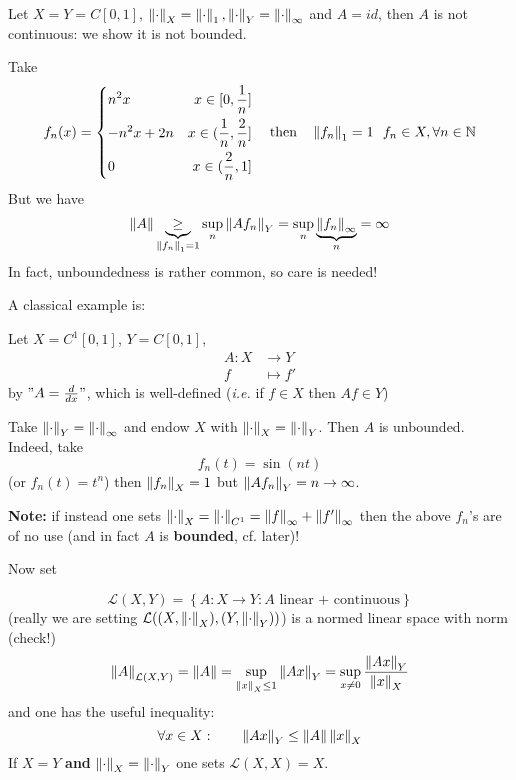 \documentclass{article}
\begin{document}
\begin{example}
    Let $X=Y=C[0,1]$, $\left\|{\cdot}\right\|_X=\left\|{\cdot}\right\|_1, \left\|{\cdot}\right\|_Y=\left\|{\cdot}\right\|_{\infty}$ and $A=id$, then $A$ is not continuous: we show it is not bounded.  

    Take 
    \begin{equation}\nonumber
f_n(x)=\left\{
\begin{aligned}
    &{n^2x} &x\in[0,\frac{1}{n}]\\
    &{-n^2x+2n} &x\in(\frac{1}{n},\frac{2}{n}]\\
    &0 &x\in(\frac{2}{n},1]\\
\end{aligned}
\right.\quad\text{then}\quad\left\|{f_n}\right\|_1=1  \  \ f_n \in X, \forall n \in \mathbb{N}
\end{equation}
But we have  
$$
\left\|{A}\right\| \underbrace{\geq}_{\left\|{f_n}\right\|_1=1} \sup_n \left\|{Af_n}\right\|_Y = \sup_n \underbrace{\left\|{f_n}\right\|_{\infty}}_n = \infty
$$
In fact, unboundedness is rather common, so care is needed!  
\end{example}  

A classical example is:  

\begin{example}
    Let $X=C^1[0,1]$, $Y=C[0,1]$, 
    \begin{align*}
        A: X &\to Y \\
        f &\mapsto f'
    \end{align*}
    by $"A = \frac{d}{dx}"$, which is well-defined (\textit{i.e.} if $f\in X$ then $Af \in Y$)

    Take $\left\|{\cdot}\right\|_Y = \left\|{\cdot}\right\|_{\infty}$ and endow $X$ with $\left\|{\cdot}\right\|_X = \left\|{\cdot}\right\|_Y$. Then $A$ is unbounded. Indeed, take  
    $$
    f_n(t) = \sin(nt) 
    $$
    (or $f_n(t)=t^n$) then $\left\|{f_n}\right\|_X=1$ but $\left\|{Af_n}\right\|_Y=n \to \infty$.

    \textbf{Note:} if instead one sets $\left\|{\cdot}\right\|_X = \left\|{\cdot}\right\|_{C^1}=\left\|{f}\right\|_{\infty}+\left\|{f'}\right\|_{\infty}$ then the above $f_n$'s are of no use (and in fact $A$ is \textbf{bounded}, cf. later)!
\end{example}  

Now set 

$$
\mathcal{L}(X, Y) = \left\{A: X \to Y: A \text{\ linear\ +\ continuous} \right\}
$$
(really we are setting $\mathcal{L}((X, \left\|{\cdot}\right\|_X), (Y, \left\|{\cdot}\right\|_Y))$)  
is a normed linear space with norm (check!)  
$$
\left\|{A}\right\|_{\mathcal{L}(X, Y)} = \left\|{A}\right\| = \sup_{\left\|{x}\right\|_X\leq 1} \left\|{Ax}\right\|_Y = \sup_{x \neq 0} \frac{\left\|{Ax}\right\|_Y}{\left\|{x}\right\|_X}
$$ 
and one has the useful inequality:  
$$
\forall x \in X: \qquad \left\|{Ax}\right\|_Y \leq \left\|{A}\right\| \left\|{x}\right\|_X
$$
If $X=Y$ \textbf{and} $\left\|{\cdot}\right\|_X = \left\|{\cdot}\right\|_Y$ one sets $\mathcal{L}(X, X)=X$.  
\end{document}
